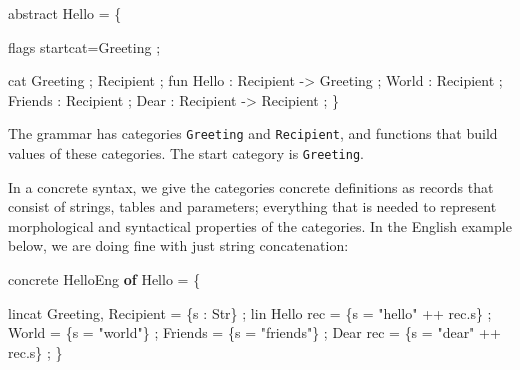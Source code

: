 \documentclass[]{article}
\newenvironment{Shaded}{\begin{snugshade}}{\end{snugshade}}
\newcommand{\KeywordTok}[1]{\textcolor[rgb]{0.13,0.29,0.53}{\textbf{{#1}}}}
\newcommand{\DataTypeTok}[1]{\textcolor[rgb]{0.13,0.29,0.53}{{#1}}}
\newcommand{\StringTok}[1]{\textcolor[rgb]{0.31,0.60,0.02}{{#1}}}
\newcommand{\OtherTok}[1]{\textcolor[rgb]{0.56,0.35,0.01}{{#1}}}
\newcommand{\FunctionTok}[1]{\textcolor[rgb]{0.00,0.00,0.00}{{#1}}}
\newcommand{\NormalTok}[1]{{#1}}
\begin{document}
\begin{Shaded}
\begin{Highlighting}[]
\NormalTok{abstract }\DataTypeTok{Hello} \FunctionTok{=} \NormalTok{\{}

\NormalTok{flags startcat}\FunctionTok{=}\DataTypeTok{Greeting} \NormalTok{;}

\NormalTok{cat}
  \DataTypeTok{Greeting} \NormalTok{;}
  \DataTypeTok{Recipient} \NormalTok{;}
\NormalTok{fun}
  \DataTypeTok{Hello}   \FunctionTok{:} \DataTypeTok{Recipient} \OtherTok{->} \DataTypeTok{Greeting} \NormalTok{;}
  \DataTypeTok{World}   \FunctionTok{:} \DataTypeTok{Recipient} \NormalTok{;}
  \DataTypeTok{Friends} \FunctionTok{:} \DataTypeTok{Recipient} \NormalTok{;}
  \DataTypeTok{Dear}    \FunctionTok{:} \DataTypeTok{Recipient} \OtherTok{->} \DataTypeTok{Recipient} \NormalTok{;}
\NormalTok{\}}
\end{Highlighting}
\end{Shaded}

The grammar has categories \texttt{Greeting} and \texttt{Recipient}, and
functions that build values of these categories. The start category is
\texttt{Greeting}.

In a concrete syntax, we give the categories concrete definitions as
records that consist of strings, tables and parameters; everything that
is needed to represent morphological and syntactical properties of the
categories. In the English example below, we are doing fine with just
string concatenation:

\begin{Shaded}
\begin{Highlighting}[]
\NormalTok{concrete }\DataTypeTok{HelloEng} \KeywordTok{of} \DataTypeTok{Hello} \FunctionTok{=} \NormalTok{\{}

\NormalTok{lincat}
  \DataTypeTok{Greeting}\NormalTok{, }\DataTypeTok{Recipient} \FunctionTok{=} \NormalTok{\{s }\FunctionTok{:} \DataTypeTok{Str}\NormalTok{\} ;}
\NormalTok{lin}
  \DataTypeTok{Hello} \NormalTok{rec }\FunctionTok{=} \NormalTok{\{s }\FunctionTok{=} \StringTok{"hello"} \FunctionTok{++} \NormalTok{rec}\FunctionTok{.}\NormalTok{s\} ;}
  \DataTypeTok{World}     \FunctionTok{=} \NormalTok{\{s }\FunctionTok{=} \StringTok{"world"}\NormalTok{\} ;}
  \DataTypeTok{Friends}   \FunctionTok{=} \NormalTok{\{s }\FunctionTok{=} \StringTok{"friends"}\NormalTok{\} ;}
  \DataTypeTok{Dear}  \NormalTok{rec }\FunctionTok{=} \NormalTok{\{s }\FunctionTok{=} \StringTok{"dear"} \FunctionTok{++} \NormalTok{rec}\FunctionTok{.}\NormalTok{s\} ;}
\NormalTok{\}}
\end{Highlighting}
\end{Shaded}
\end{document}
